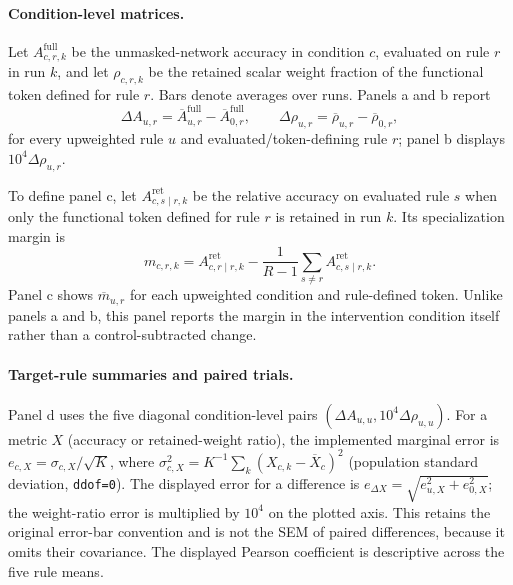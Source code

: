 \documentclass{article}
\begin{document}
\paragraph{Condition-level matrices.}
Let $A^{\mathrm{full}}_{c,r,k}$ be the unmasked-network accuracy in condition $c$, evaluated on rule $r$ in run $k$, and let $\rho_{c,r,k}$ be the retained scalar weight fraction of the functional token defined for rule $r$. Bars denote averages over runs. Panels a and b report
\begin{equation}
\Delta A_{u,r}=\overline{A}^{\mathrm{full}}_{u,r}-\overline{A}^{\mathrm{full}}_{0,r},
\qquad
\Delta\rho_{u,r}=\overline{\rho}_{u,r}-\overline{\rho}_{0,r},
\end{equation}
for every upweighted rule $u$ and evaluated/token-defining rule $r$; panel b displays $10^4\Delta\rho_{u,r}$.

To define panel c, let $A^{\mathrm{ret}}_{c,s\mid r,k}$ be the relative accuracy on evaluated rule $s$ when only the functional token defined for rule $r$ is retained in run $k$. Its specialization margin is
\begin{equation}
m_{c,r,k}
=
A^{\mathrm{ret}}_{c,r\mid r,k}
-
\frac{1}{R-1}\sum_{s\ne r}A^{\mathrm{ret}}_{c,s\mid r,k}.
\end{equation}
Panel c shows $\overline{m}_{u,r}$ for each upweighted condition and rule-defined token. Unlike panels a and b, this panel reports the margin in the intervention condition itself rather than a control-subtracted change.

\paragraph{Target-rule summaries and paired trials.}
Panel d uses the five diagonal condition-level pairs $(\Delta A_{u,u},10^4\Delta\rho_{u,u})$. For a metric $X$ (accuracy or retained-weight ratio), the implemented marginal error is $e_{c,X}=\sigma_{c,X}/\sqrt K$, where $\sigma_{c,X}^2=K^{-1}\sum_k(X_{c,k}-\overline X_c)^2$ (population standard deviation, \texttt{ddof=0}). The displayed error for a difference is $e_{\Delta X}=\sqrt{e_{u,X}^2+e_{0,X}^2}$; the weight-ratio error is multiplied by $10^4$ on the plotted axis. This retains the original error-bar convention and is not the SEM of paired differences, because it omits their covariance. The displayed Pearson coefficient is descriptive across the five rule means.
\end{document}
